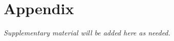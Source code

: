 \documentclass[../main.tex]{subfiles}
\begin{document}
\section*{Appendix}

\textit{Supplementary material will be added here as needed.}
\end{document}
